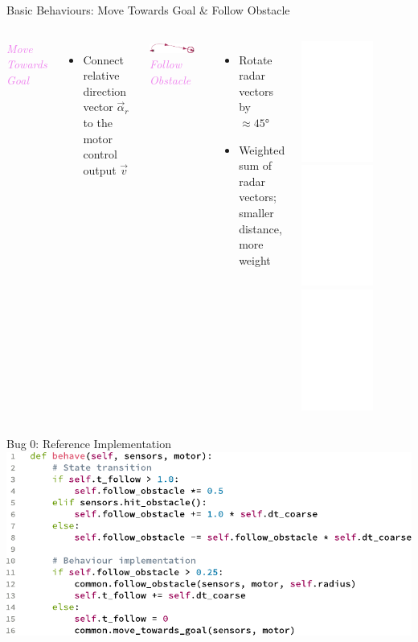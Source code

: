 \documentclass[aspectratio=169]{beamer}
\begin{document}
\begin{frame}{Basic Behaviours: Move Towards Goal \& Follow Obstacle}
	\begin{columns}[t]
		\emph{\textcolor{violet}{Move Towards Goal}}\\
		\begin{itemize}
			\item Connect relative direction vector $\vec \alpha_r$ to the motor control output $\vec v$
		\end{itemize}
		\vspace{1.5cm}
		\centering
		\includegraphics[width=0.85\textwidth]{media/move_goal_direction.pdf}
		\emph{\textcolor{violet}{Follow Obstacle}}\\
		\begin{itemize}
			\item Rotate radar vectors by $\approx 45°$
			\item Weighted sum of radar vectors; smaller distance, more weight
		\end{itemize}
		\centering
		\includegraphics<1>[width=0.65\textwidth]{media/radar_1.pdf}
		\includegraphics<2>[width=0.65\textwidth]{media/radar_2.pdf}
		\includegraphics<3>[width=0.65\textwidth]{media/radar_3.pdf}
	\end{columns}
\end{frame}


\begin{frame}{Bug 0: Reference Implementation}
	\centering
	\includegraphics{media/bug_0_ref_code.pdf}
\end{frame}
\end{document}

